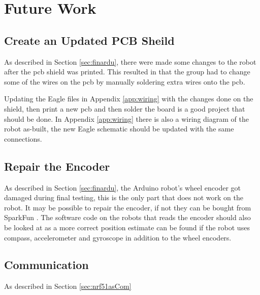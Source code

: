 \chapter{Future Work}
    \section{Create an Updated PCB Sheild}
        \label{sec:fwSkjold}
        As described in Section \ref{sec:finardu}, there were made some changes to the robot after the \acrshort{pcb} shield was printed. This resulted in that the group had to change some of the wires on the \acrshort{pcb} by manually soldering extra wires onto the \acrshort{pcb}. 

        Updating the Eagle files in Appendix \ref{app:wiring} with the changes done on the shield, then print a new \acrshort{pcb} and then solder the board is a good project that should be done. In Appendix \ref{app:wiring} there is also a wiring diagram of the robot as-built, the new Eagle schematic should be updated with the same connections.

    \section{Repair the Encoder}
        As described in Section \ref{sec:finardu}, the Arduino robot's wheel encoder got damaged during final testing, this is the only part that does not work on the robot. It may be possible to repair the encoder, if not they can be bought from SparkFun \cite{sparkfun}. The software code on the robots that reads the encoder should also be looked at as a more correct position estimate can be found if the robot uses compass, accelerometer and gyroscope in addition to the wheel encoders.

    \section{Communication}
        As described in Section \ref{sec:nrf51asCom}



